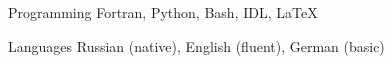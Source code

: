 

\begin{cvskills}

  \cvskill
    {Programming} %
    {Fortran, Python, Bash, IDL, LaTeX} %


  \cvskill
    {Languages} %
    {Russian (native), English (fluent), German (basic)} %

\end{cvskills}
